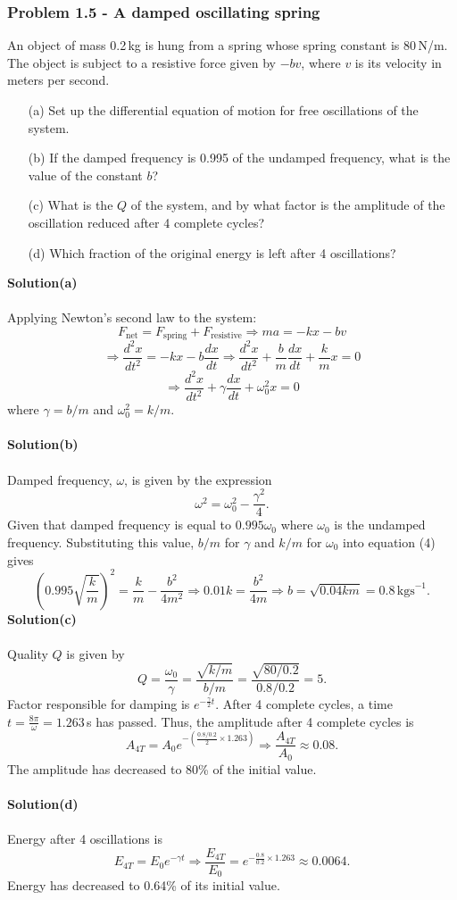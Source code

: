 \documentclass[12pt,a4paper]{article}
\begin{document}
\subsubsection*{Problem 1.5 - A damped oscillating spring}
An object of mass 0.2\,kg is hung from a spring whose spring constant is 80\,N/m. The object is subject to a resistive force given by $-bv$, where $v$ is its velocity in meters per second.
\begin{enumerate}
    \item[(a)]Set up the differential equation of motion for free oscillations of the system.
    \item[(b)]If the damped frequency is 0.995 of the undamped frequency, what is the value of the constant $b$?
    \item[(c)]What is the $Q$ of the system, and by what factor is the amplitude of the oscillation reduced after 4 complete cycles?
    \item[(d)]Which fraction of the original energy is left after 4 oscillations?
\end{enumerate}
\textbf{Solution(a)}
\\
\\Applying Newton's second law to the system:
\[F_{\text{net}}=F_{\text{spring}}+F_{\text{resistive}}\Rightarrow ma=-kx-bv\]
\[\Rightarrow\frac{d^2x}{dt^2}=-kx-b\frac{dx}{dt}\Rightarrow \frac{d^2x}{dt^2}+\frac{b}{m}\frac{dx}{dt}+\frac{k}{m}x=0\]
\[\Rightarrow \frac{d^2x}{dt^2}+\gamma\frac{dx}{dt}+\omega_0^2x=0\]
where $\gamma=b/m$ and $\omega_0^2=k/m$.
\\
\\\textbf{Solution(b)}
\\
\\Damped frequency, $\omega$, is given by the expression
\begin{equation}
    \omega^2=\omega_0^2-\frac{\gamma^2}{4}.
\end{equation}
Given that damped frequency is equal to $0.995\omega_0$ where $\omega_0$ is the undamped frequency. Substituting this value, $b/m$ for $\gamma$ and $k/m$ for $\omega_0$ into equation (4) gives
\[\left(0.995\sqrt{\frac{k}{m}}\right)^2=\frac{k}{m}-\frac{b^2}{4m^2}\Rightarrow 0.01k=\frac{b^2}{4m}\Rightarrow b=\sqrt{0.04km}=0.8\,\text{kgs}^{-1}.\]
\textbf{Solution(c)}
\\
\\Quality $Q$ is given by
\[Q=\frac{\omega_0}{\gamma}=\frac{\sqrt{k/m}}{b/m}=\frac{\sqrt{80/0.2}}{0.8/0.2}=5.\]
Factor responsible for damping is $e^{-\frac{\gamma}{2}t}$. After 4 complete cycles, a time $t=\frac{8\pi}{\omega}=1.263\,$s has passed. Thus, the amplitude after 4 complete cycles is
\[A_{4T}=A_0e^{-(\frac{0.8/0.2}{2}\times1.263)}\Rightarrow \frac{A_{4T}}{A_0}\approx0.08.\]
The amplitude has decreased to 80\% of the initial value.
\\
\\\textbf{Solution(d)}
\\
\\Energy after 4 oscillations is
\[E_{4T}=E_0e^{-\gamma t}\Rightarrow \frac{E_{4T}}{E_0}=e^{-\frac{0.8}{0.2}\times1.263}\approx0.0064.\]
Energy has decreased to 0.64\% of its initial value.
\end{document}
